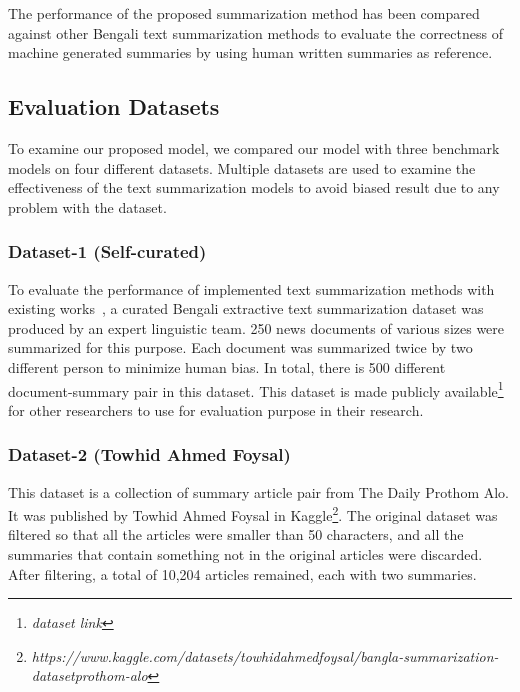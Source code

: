 The performance of the proposed summarization method has been compared against other Bengali text summarization methods to evaluate the correctness of machine generated summaries by using human written summaries as reference.

\subsection{Evaluation Datasets}\label{subsec:evaluation-datasets}
To examine our proposed model, we compared our model with three benchmark models on four different datasets. Multiple datasets are used to examine the effectiveness of the text summarization models to avoid biased result due to any problem with the dataset.

\subsubsection{Dataset-1 (Self-curated)}
To evaluate the performance of implemented text summarization methods with existing works~\cite{chowdhury-etal-2021-tfidf-clustering,Erkan-lexRank-2004,roychowdhury-etal-2022-spectral-base}, a curated Bengali extractive text summarization dataset was produced by an expert linguistic team. 250 news documents of various sizes were summarized for this purpose. Each document was summarized twice by two different person to minimize human bias. In total, there is 500 different document-summary pair in this dataset. This dataset is made publicly available\footnote{\textit{dataset link}} for other researchers to use for evaluation purpose in their research.

\subsubsection{Dataset-2 (Towhid Ahmed Foysal)\cite{ahmed_2023_TAF_dataset}}
This dataset is a collection of summary article pair from The Daily Prothom Alo. It was published by Towhid Ahmed Foysal in Kaggle\footnote{\textit{https://www.kaggle.com/datasets/towhidahmedfoysal/bangla-summarization-datasetprothom-alo}}. The original dataset was filtered so that all the articles were smaller than 50 characters, and all the summaries that contain something not in the original articles were discarded. After filtering, a total of 10,204 articles remained, each with two summaries.

